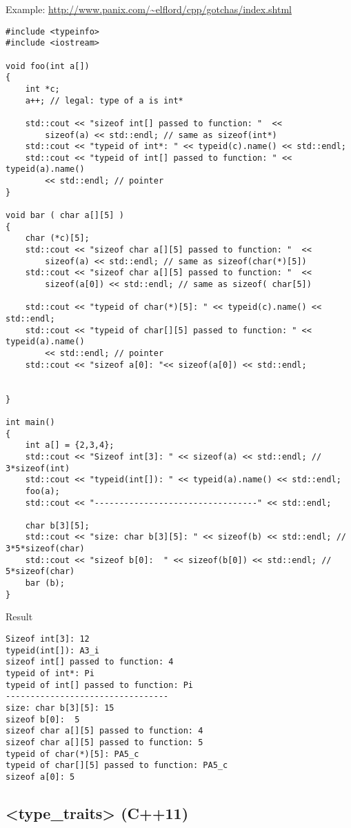 Example: \url{http://www.panix.com/~elflord/cpp/gotchas/index.shtml}
\begin{verbatim}
#include <typeinfo>
#include <iostream>

void foo(int a[])
{
	int *c;
	a++; // legal: type of a is int*

	std::cout << "sizeof int[] passed to function: "  <<
		sizeof(a) << std::endl; // same as sizeof(int*)
	std::cout << "typeid of int*: " << typeid(c).name() << std::endl;
	std::cout << "typeid of int[] passed to function: " << typeid(a).name() 
		<< std::endl; // pointer
}

void bar ( char a[][5] )
{
	char (*c)[5];
	std::cout << "sizeof char a[][5] passed to function: "  <<
		sizeof(a) << std::endl; // same as sizeof(char(*)[5])
	std::cout << "sizeof char a[][5] passed to function: "  <<
		sizeof(a[0]) << std::endl; // same as sizeof( char[5])

	std::cout << "typeid of char(*)[5]: " << typeid(c).name() << std::endl;
	std::cout << "typeid of char[][5] passed to function: " << typeid(a).name() 
		<< std::endl; // pointer
	std::cout << "sizeof a[0]: "<< sizeof(a[0]) << std::endl;


}

int main()
{
	int a[] = {2,3,4};
	std::cout << "Sizeof int[3]: " << sizeof(a) << std::endl; // 3*sizeof(int)
	std::cout << "typeid(int[]): " << typeid(a).name() << std::endl; 
	foo(a);
	std::cout << "---------------------------------" << std::endl;

	char b[3][5]; 
	std::cout << "size: char b[3][5]: " << sizeof(b) << std::endl; // 3*5*sizeof(char)
	std::cout << "sizeof b[0]:  " << sizeof(b[0]) << std::endl; // 5*sizeof(char)
	bar (b);
}
\end{verbatim}


Result
\begin{verbatim}
Sizeof int[3]: 12
typeid(int[]): A3_i
sizeof int[] passed to function: 4
typeid of int*: Pi
typeid of int[] passed to function: Pi
---------------------------------
size: char b[3][5]: 15
sizeof b[0]:  5
sizeof char a[][5] passed to function: 4
sizeof char a[][5] passed to function: 5
typeid of char(*)[5]: PA5_c
typeid of char[][5] passed to function: PA5_c
sizeof a[0]: 5
\end{verbatim}

\subsection{<type\_traits> (C++11)}
\label{sec:type_trait}
\label{sec:type_traits-header}

